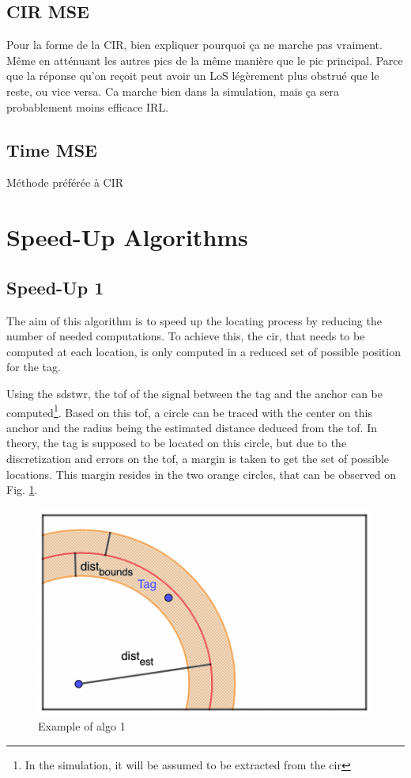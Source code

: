\subsection{CIR MSE}

Pour la forme de la CIR, bien expliquer pourquoi ça ne marche pas vraiment. Même en atténuant les autres pics de la même manière que le pic principal. Parce que la réponse qu'on reçoit peut avoir un LoS légèrement plus obstrué que le reste, ou vice versa. Ca marche bien dans la simulation, mais ça sera probablement moins efficace IRL.

\subsection{Time MSE}

Méthode préférée à CIR

\section{Speed-Up Algorithms}

\subsection{Speed-Up 1}

The aim of this algorithm is to speed up the locating process by reducing the number of needed computations. To achieve this, the \gls{cir}, that needs to be computed at each location, is only computed in a reduced set of possible position for the tag.
\vspace{2mm}

Using the \gls{sdstwr}, the \gls{tof} of the signal between the tag and the anchor can be computed\footnote{In the simulation, it will be assumed to be extracted from the \gls{cir}}. Based on this \gls{tof}, a circle can be traced with the center on this anchor and the radius being the estimated distance deduced from the \gls{tof}. In theory, the tag is supposed to be located on this circle, but due to the discretization and errors on the \gls{tof}, a margin is taken to get the set of possible locations. This margin resides in the two orange circles, that can be observed on Fig. \ref{fig:speedup_1}.
\vspace{2mm}

\begin{figure}[H]
\centering
\includegraphics[width=.65\linewidth]{Images/algo_1.png}
\caption{Example of algo 1}
\label{fig:speedup_1}
\end{figure}

